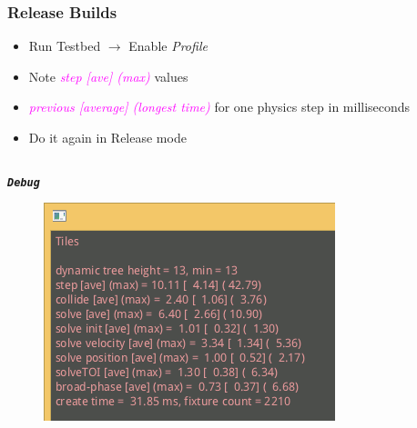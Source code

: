 \documentclass[glossy]{beamer}
\newcommand{\filename}[1]{\texttt{\textbf{\emph{#1}}}}
\begin{document}
\begin{frame}[fragile=singleslide]
  \frametitle{Release Builds}

  \begin{itemize}
    \item Run Testbed $\rightarrow$ Enable \emph{Profile}
    \item Note \textcolor{magenta}{\emph{step [ave] (max)}} values
    \item \textcolor{magenta}{\emph{previous [average] (longest time)}} for one physics step in milliseconds
    \item Do it again in Release mode
  \end{itemize}

  \begin{columns}[t]
    \begin{column}{6cm}
      \filename{Debug}
      \begin{figure}
        \centering
        \includegraphics[width=\columnwidth]{windows-08}
      \end{figure}
    \end{column}


\end{columns}
\end{frame}
\end{document}

